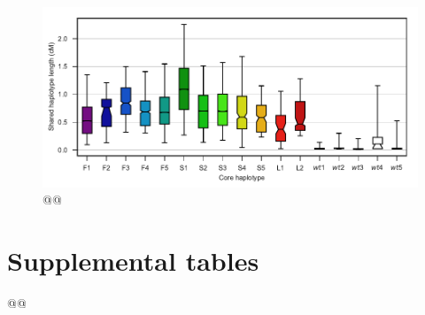 \documentclass[a4paper,11pt,abstracton,hidelinks]{scrartcl}
\begin{document}
\clearpage
\begin{figure}[t!]
\centering
\includegraphics[width=1.1\linewidth,center]{artwork/chapter6/pspd.pdf}
\caption{@@
}
\label{fig:pspd}
\end{figure}


\clearpage
\section{Supplemental tables}\label{sec:supplemental-tables}


@@
\end{document}
